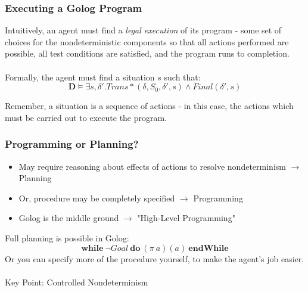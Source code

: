 \documentclass{beamer}
\begin{document}
\begin{frame}
\frametitle{Executing a Golog Program}
Intuitively, an agent must find a \emph{legal execution} of its program - some set of choices for the nondeterministic components so that all
actions performed are possible, all test conditions are satisfied, and the
program runs to completion.\\
\ \\
Formally, the agent must find a situation $s$ such that:\[
\mathbf{D} \models \exists s,\delta' . Trans*(\delta,S_0,\delta',s) \wedge Final(\delta',s)\]

Remember, a situation is a sequence of actions - in this case, the actions which must be carried out to execute the program.
\end{frame}

\begin{frame}
\frametitle{Programming or Planning?}
\begin{itemize}
  \item May require reasoning about effects of actions to resolve nondeterminism
$\rightarrow$ Planning
  \item Or, procedure may be completely specified $\rightarrow$ Programming
  \item Golog is the middle ground $\rightarrow$ "High-Level Programming"
\end{itemize}
\pause
Full planning is possible in Golog:\[
\mathbf{while}\ \neg Goal\ \mathbf{do}\ (\pi\ a)(a)\ \mathbf{endWhile}\]
\pause
Or you can specify more of the procedure yourself, to make the agent's job
easier.\\
\ \\
Key Point: \alert{Controlled} Nondeterminism
\end{frame}
\end{document}
